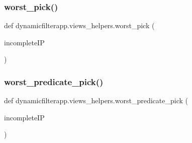 \subsubsection{\texorpdfstring{worst\_pick()}{worst\_pick()}}
{\footnotesize\ttfamily def dynamicfilterapp.\+views\+\_\+helpers.\+worst\+\_\+pick (\begin{DoxyParamCaption}\item[{}]{incomplete\+IP }\end{DoxyParamCaption})}

\mbox{\label{namespacedynamicfilterapp_1_1views__helpers_a0fc083f3d6a368a4f543011330fff151}} 
\subsubsection{\texorpdfstring{worst\_predicate\_pick()}{worst\_predicate\_pick()}}
{\footnotesize\ttfamily def dynamicfilterapp.\+views\+\_\+helpers.\+worst\+\_\+predicate\+\_\+pick (\begin{DoxyParamCaption}\item[{}]{incomplete\+IP }\end{DoxyParamCaption})}

